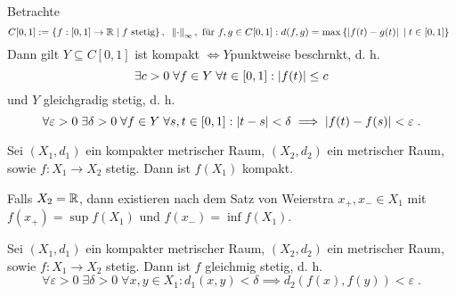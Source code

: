 	 \begin{ex}
	 	Betrachte 
	 	\[C[0,1] := \left\{f:[0,1] \to \mathbb{R} \;\vert\; f\text{ stetig}\right\}, \;\; \left\lVert\cdot\right\rVert_\infty , \text{ f{\"u}r } f, g \in C[0,1]: d(f,g) = \max \left\{\left\lvert f(t)- g(t) \right\rvert\;\vert\; t\in[0,1]\right\}\;\;\]
	 	Dann gilt $Y\subseteq C[0,1]$ ist kompakt $\iff Y$punktweise beschr\as nkt, d. h. 
	 	\[\exists c>0 \;\forall f \in Y \;\forall t \in [0,1]: \left\lvert f(t) \right\rvert \leq c\]
	 	und $Y$ gleichgradig stetig, d. h. 
	 	\[\forall \varepsilon > 0\; \exists \delta > 0 \;\forall f \in Y\;\forall s, t \in [0,1]: \left\lvert t-s \right\rvert < \delta \implies \left\lvert f(t) - f(s) \right\rvert < \varepsilon \;.\]
	 \end{ex} 
	 
	 \begin{theorem}
	 	Sei \((X_1, d_1)\) ein kompakter metrischer Raum, \((X_2, d_2)\) ein metrischer Raum, sowie \(f:X_1 \to X_2\) stetig. Dann ist \(f(X_1)\) kompakt.
	 \end{theorem}
	 \begin{rem}
	 	Falls $X_2 = \mathbb{R}$, dann existieren nach dem Satz von Weierstra\s{} \(x_+, x_- \in X_1\) mit \(f(x_+) = \sup f(X_1)\) und \(f(x_-) = \inf f(X_1)\).
	 \end{rem}
	 
	 \begin{theorem}
	 		Sei \((X_1, d_1)\) ein kompakter metrischer Raum, \((X_2, d_2)\) ein metrischer Raum, sowie \(f:X_1 \to X_2\) stetig. Dann ist $f$ gleichm\as \s ig stetig, d. h. 
	 		\[\forall \varepsilon > 0 \;\exists \delta > 0 \;\forall x,y \in X_1: d_1(x,y) < \delta \implies d_2(f(x), f(y)) < \varepsilon\;.\]
	 		
	 \end{theorem}
